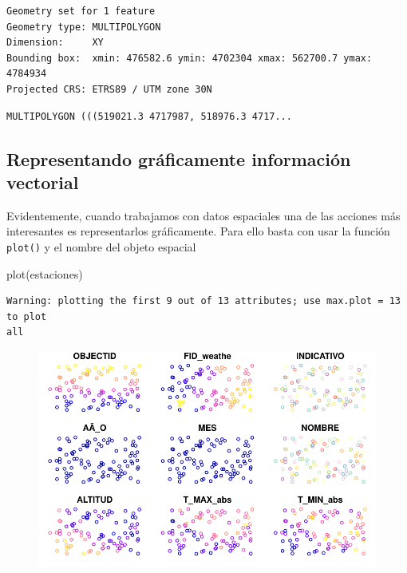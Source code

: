 \documentclass[
  letterpaper,
  DIV=11,
  numbers=noendperiod]{scrreprt}
\newenvironment{Shaded}{\begin{snugshade}}{\end{snugshade}}
\newcommand{\DecValTok}[1]{\textcolor[rgb]{0.68,0.00,0.00}{#1}}
\newcommand{\FunctionTok}[1]{\textcolor[rgb]{0.28,0.35,0.67}{#1}}
\newcommand{\NormalTok}[1]{\textcolor[rgb]{0.00,0.23,0.31}{#1}}
\newcommand{\SpecialCharTok}[1]{\textcolor[rgb]{0.37,0.37,0.37}{#1}}
\begin{document}
\begin{Shaded}
\end{Shaded}

\begin{verbatim}
Geometry set for 1 feature 
Geometry type: MULTIPOLYGON
Dimension:     XY
Bounding box:  xmin: 476582.6 ymin: 4702304 xmax: 562700.7 ymax: 4784934
Projected CRS: ETRS89 / UTM zone 30N
\end{verbatim}

\begin{verbatim}
MULTIPOLYGON (((519021.3 4717987, 518976.3 4717...
\end{verbatim}

\hypertarget{representando-gruxe1ficamente-informaciuxf3n-vectorial}{%
\subsection{Representando gráficamente información
vectorial}\label{representando-gruxe1ficamente-informaciuxf3n-vectorial}}

Evidentemente, cuando trabajamos con datos espaciales una de las
acciones más interesantes es representarlos gráficamente. Para ello
basta con usar la función \texttt{plot()} y el nombre del objeto
espacial

\begin{Shaded}
\begin{Highlighting}[]
\FunctionTok{plot}\NormalTok{(estaciones)}
\end{Highlighting}
\end{Shaded}

\begin{verbatim}
Warning: plotting the first 9 out of 13 attributes; use max.plot = 13 to plot
all
\end{verbatim}

\begin{figure}[H]

{\centering \includegraphics{03_DatosEspaciales_files/figure-pdf/unnamed-chunk-7-1.pdf}

}

\end{figure}
\end{document}
